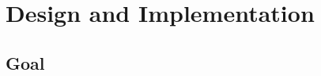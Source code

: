 \chapter{Design and Implementation}
\label{chap:cran_for_lora}








\section{Goal}

\begin{comment}
The goal is to set up a minimal working environment for a LoRa C-RAN.
The gateway's functionality should separated into an RRH and BBU component and the 
BBU component should be virtualized and run on general purpose hardware. 
A simple network server should process the uplink message and schedule a response if required. From this setup 
basic network requirements can be derived and measured as well as costs estimated.

\section{Hardware}
\begin{comment}
An Arduino Mega 2560 with the Dragino LoRa Shield v1.4 is the end-device, see Figure~\ref{fig:ard}.
A LimeSDR mini, Figure~\ref{fig:sdr}, serves as the receiver for the RRH.
The Raspberry Pi, Figure~\ref{fig:rasp} with a LoRa hat was used for testing up -and downlink signals, but not for the experiment itself. 
Its hat is the iC880A LoRaWAN concentrator for the 868MHz frequency.

\begin{figure}[H]
    \centering
    \begin{subfigure}[b]{0.25\textwidth}
     \texttt{[image: figures/arduino.png]}
     \caption{Arduino with LoRa shield}
     \label{fig:ard}
    \end{subfigure}%
    \hspace{2em}
    \begin{subfigure}[b]{0.25\textwidth}
     \texttt{[image: figures/limesdr.png]}
     \caption{LimeSDR mini}
     \label{fig:sdr}
    \end{subfigure}
    \hspace{2em}
    \begin{subfigure}[b]{0.25\textwidth}
     \texttt{[image: figures/raspberry.png]}
     \caption{Raspberry Pi with LoRa hat}
     \label{fig:rasp}
    \end{subfigure}
    \caption{Hardware devices}
\end{figure}


\end{comment}
